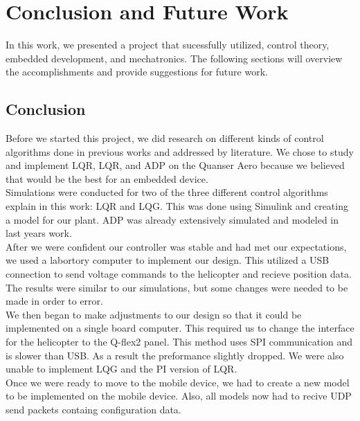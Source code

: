 \chapter{Conclusion and Future Work}
\label{ch: Chapter6}
In this work, we presented a project that sucessfully utilized, control theory, embedded development, and mechatronics.  The following sections will overview the accomplishments and provide suggestions for future work.

\section{Conclusion}
Before we started this project, we did research on different kinds of control algorithms done in previous works and addressed by literature.  We chose to study and implement LQR, LQR, and ADP on the Quanser Aero because we believed that would be the best for an embedded device.\\
Simulations were conducted for two of the three different control algorithms explain in this work: LQR and LQG.  This was done using Simulink and creating a model for our plant.  ADP was already extensively simulated and modeled in last years work.\\
After we were confident our controller was stable and had met our expectations, we used a labortory computer to implement our design.  This utilized a USB connection to send voltage commands to the helicopter and recieve position data.  The results were similar to our simulations, but some changes were needed to be made in order to error. \\
We then began to make adjustments to our design so that it could be implemented on a single board computer.  This required us to change the interface for the helicopter to the Q-flex2 panel.  This method uses SPI communication and is slower than USB.  As a result the preformance slightly dropped.  We were also unable to implement LQG and the PI version of LQR.\\
Once we were ready to move to the mobile device, we had to create a new model to be implemented on the mobile device.  Also, all models now had to recive UDP send packets containg configuration data. 


